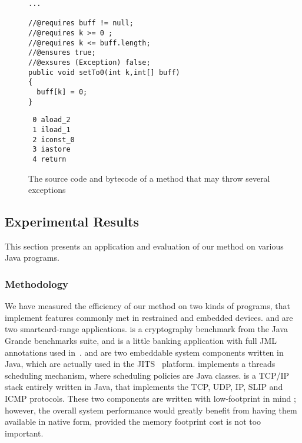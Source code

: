 \begin{figure}
\begin{minipage}[b]{0.5\linewidth}
\begin{verbatim}
...

//@requires buff != null;
//@requires k >= 0 ;
//@requires k <= buff.length;
//@ensures true;
//@exsures (Exception) false;
public void setTo0(int k,int[] buff)
{
  buff[k] = 0;
}
\end{verbatim}
\end{minipage}
\hspace{.5cm}
\begin{minipage}[b]{0.4\linewidth}
 \begin{verbatim}
 0 aload_2
 1 iload_1
 2 iconst_0
 3 iastore
 4 return
\end{verbatim}
\end{minipage}
\caption{The source code and bytecode of a method that may throw several exceptions}
\label{fig:jmlpreciseex}
\end{figure}

\subsection{Experimental Results}
\label{sec:experiments}

This section presents an application and evaluation of our method on various Java programs.

\subsubsection{Methodology}

We have measured the efficiency of our method on two kinds of programs, that implement features commonly met in restrained and embedded devices.  and  are two smartcard-range applications.  is a cryptography benchmark from the Java Grande benchmarks suite, and  is a little banking application with full JML annotations used in~\cite{BRL-JACK}.  and  are two embeddable system components written in Java, which are actually used in the JITS~\cite{JITSWebsite} platform.  implements a threads scheduling mechanism, where scheduling policies are Java classes.  is a TCP/IP stack entirely written in Java, that implements the TCP, UDP, IP, SLIP and ICMP protocols. These two components are written with low-footprint in mind ; however, the overall system performance would greatly benefit from having them available in native form, provided the memory footprint cost is not too important.

